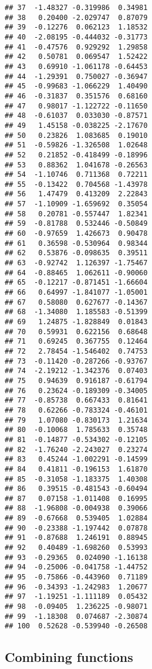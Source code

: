 \documentclass[12pt,a4paper]{scrartcl}\usepackage[]{graphicx}\usepackage[]{color}
\makeatletter
\newenvironment{kframe}{%
 \def\at@end@of@kframe{}%
 \ifinner\ifhmode%
  \def\at@end@of@kframe{\end{minipage}}%
  \begin{minipage}{\columnwidth}%
 \fi\fi%
 \def\FrameCommand##1{\hskip\@totalleftmargin \hskip-\fboxsep
 \colorbox{shadecolor}{##1}\hskip-\fboxsep
     \hskip-\linewidth \hskip-\@totalleftmargin \hskip\columnwidth}%
 \MakeFramed {\advance\hsize-\width
   \@totalleftmargin\z@ \linewidth\hsize
   \@setminipage}}%
 {\par\unskip\endMakeFramed%
 \at@end@of@kframe}
\newenvironment{knitrout}{}{} %
\makeatother
\begin{document}
\begin{Answer}
\begin{knitrout}
\begin{kframe}
\begin{verbatim}
## 37  -1.48327 -0.319986  0.34981
## 38   0.20400 -2.029747  0.87079
## 39  -0.12276  0.062123  1.18532
## 40  -2.08195 -0.444032 -0.31773
## 41  -0.47576  0.929292  1.29858
## 42   0.50781  0.069547  1.52422
## 43   0.69910 -1.061178 -0.64453
## 44  -1.29391  0.750027 -0.36947
## 45  -0.99683 -1.066229  1.40490
## 46  -0.31837  0.351576  0.68160
## 47   0.98017 -1.122722 -0.11650
## 48  -0.61037  0.033030 -0.87571
## 49   1.45158 -0.038225 -2.17670
## 50   0.23826  1.083685  0.19010
## 51  -0.59826 -1.326508  1.02648
## 52   0.21852 -0.418499 -0.18996
## 53   0.88362  1.041678 -0.26563
## 54  -1.10746  0.711368  0.72211
## 55  -0.13422  0.704568 -1.43978
## 56   1.47479  0.413209  2.22843
## 57  -1.10909 -1.659692  0.35054
## 58   0.20781 -0.557447  1.82341
## 59  -0.81788  0.532446 -0.50849
## 60  -0.97659  1.426673  0.90478
## 61   0.36598 -0.530964  0.98344
## 62   0.53876 -0.098635  0.39511
## 63  -0.92742  1.126397 -1.75467
## 64  -0.88465  1.062611 -0.90060
## 65  -0.12217 -0.871451 -1.66604
## 66   0.64997 -1.841077 -1.05001
## 67   0.58080  0.627677 -0.14367
## 68  -1.34080  1.185583 -0.51399
## 69   1.24875 -1.828849  0.01843
## 70   0.59931  0.622156  0.68648
## 71   0.69245  0.367755  0.12464
## 72   2.78454 -1.546402  0.74753
## 73  -0.11420 -0.287266 -0.93767
## 74  -2.19212 -1.342376  0.07403
## 75   0.94639  0.916187 -0.61794
## 76   0.23624 -0.189309 -0.34005
## 77  -0.85738  0.667433  0.81641
## 78   0.62266 -0.783324 -0.46101
## 79   1.07080 -0.830173  1.21634
## 80  -0.10068  1.785633  0.35748
## 81  -0.14877 -0.534302 -0.12105
## 82  -1.76240 -2.243027  0.23274
## 83   0.45244 -1.002291 -0.14599
## 84   0.41811 -0.196153  1.61870
## 85  -0.31058 -1.183375  1.40308
## 86   0.39515 -0.481543 -0.60494
## 87   0.07158 -1.011408  0.16995
## 88  -1.96808 -0.004938  0.39066
## 89  -0.67668  0.539405  1.02884
## 90  -0.23388 -1.197442  0.07878
## 91  -0.87688  1.246191  0.88945
## 92   0.40489 -1.698260  0.53993
## 93  -0.29365  0.024090 -1.16138
## 94  -0.25006 -0.041758 -1.44752
## 95  -0.75866 -0.443960  0.71189
## 96  -0.34393 -1.242983  1.20677
## 97  -1.19251 -1.111189  0.05432
## 98  -0.09405  1.236225 -0.98071
## 99  -1.18308  0.074687 -2.30874
## 100  0.52628 -0.539940 -0.26508
\end{verbatim}
\end{kframe}
\end{knitrout}
\end{Answer}
\clearpage

\subsection{Combining functions}
\end{document}

